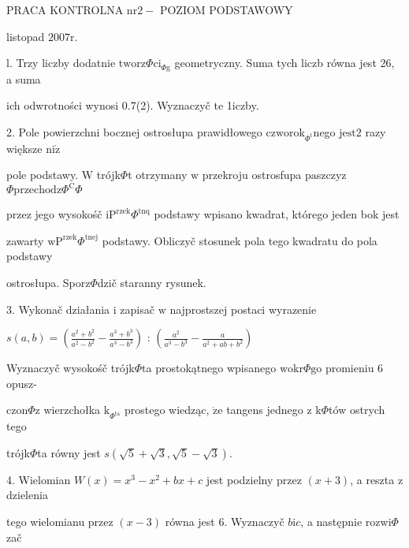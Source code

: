 \documentclass[a4paper,12pt]{article}
\begin{document}
PRACA KONTROLNA $\mathrm{n}\mathrm{r}2-$ POZIOM PODSTAWOWY

listopad $2007\mathrm{r}.$

l. Trzy liczby dodatnie $\mathrm{t}\mathrm{w}\mathrm{o}\mathrm{r}\mathrm{z}\Phi \mathrm{c}\mathrm{i}_{\Phi \mathrm{g}}$ geometryczny. Suma tych liczb równa jest 26, a suma

ich odwrotności wynosi 0.7(2). Wyznaczyč te 1iczby.

2. Pole powierzchni bocznej ostrosłupa prawidłowego $\mathrm{c}\mathrm{z}\mathrm{w}\mathrm{o}\mathrm{r}\mathrm{o}\mathrm{k}_{\Phi^{\mathrm{t}}}$nego j$\mathrm{e}\mathrm{s}\mathrm{t}2$ razy większe $\mathrm{n}\mathrm{i}\dot{\mathrm{z}}$

pole podstawy. $\mathrm{W}$ trójk$\Phi$t otrzymany $\mathrm{w}$ przekroju ostrosfupa $\mathrm{p}\mathrm{a}$szczyz $\Phi \mathrm{p}\mathrm{r}\mathrm{z}\mathrm{e}\mathrm{c}\mathrm{h}\mathrm{o}\mathrm{d}\mathrm{z}\Phi^{\mathrm{C}}\Phi$

przez jego wysokośč $\mathrm{i} \mathrm{P}^{\mathrm{r}\mathrm{z}\mathrm{e}\mathrm{k}}\Phi^{\mathrm{t}\mathrm{n}\mathrm{q}}$ podstawy wpisano kwadrat, którego jeden bok jest

zawarty $\mathrm{w}\mathrm{P}^{\mathrm{r}\mathrm{z}\mathrm{e}\mathrm{k}}\Phi^{\mathrm{t}\mathrm{n}\mathrm{e}\mathrm{j}}$ podstawy. Obliczyč stosunek pola tego kwadratu do pola podstawy

ostrosłupa. Sporz$\Phi$dzič staranny rysunek.

3. Wykonač działania $\mathrm{i}$ zapisač $\mathrm{w}$ najprostszej postaci wyrazenie

$s(a,b)= (\displaystyle \frac{a^{2}+b^{2}}{a^{2}-b^{2}}-\frac{a^{3}+b^{3}}{a^{3}-b^{3}})$ : $(\displaystyle \frac{a^{2}}{a^{3}-b^{3}}-\frac{a}{a^{2}+ab+b^{2}})$

Wyznaczyč wysokośč trójk$\Phi$ta prostokątnego wpisanego $\mathrm{w}\mathrm{o}\mathrm{k}\mathrm{r}\Phi \mathrm{g}\mathrm{o}$ promieniu 6 opusz-

$\mathrm{c}\mathrm{z}\mathrm{o}\mathrm{n}\Phi \mathrm{z}$ wierzchołka $\mathrm{k}_{\Phi^{\mathrm{t}\mathrm{a}}}$ prostego wiedząc, $\dot{\mathrm{z}}\mathrm{e}$ tangens jednego $\mathrm{z}$ k$\Phi$tów ostrych tego

trójk$\Phi$ta równy jest $s(\sqrt{5}+\sqrt{3},\sqrt{5}-\sqrt{3}).$

4. Wielomian $W(x) =x^{3}-x^{2}+bx+c$ jest podzielny przez $(x+3)$, a reszta $\mathrm{z}$ dzielenia

tego wielomianu przez $(x-3)$ równa jest 6. Wyznaczyč $b\mathrm{i} c$, a następnie rozwi$\Phi$zač
\end{document}
